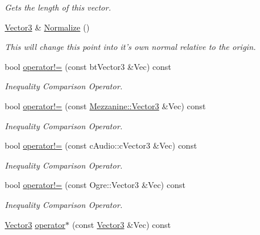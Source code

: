 \begin{DoxyCompactItemize}
\begin{DoxyCompactList}\small\item\em Gets the length of this vector. \item\end{DoxyCompactList}\item 
\hyperlink{classMezzanine_1_1Vector3}{Vector3} \& \hyperlink{classMezzanine_1_1Vector3_aa8705900b168f9d5234bf6de5e9564b1}{Normalize} ()
\begin{DoxyCompactList}\small\item\em This will change this point into it's own normal relative to the origin. \item\end{DoxyCompactList}\item 
bool \hyperlink{classMezzanine_1_1Vector3_a5553723899629247d1fd8031ede27c31}{operator!=} (const btVector3 \&Vec) const 
\begin{DoxyCompactList}\small\item\em Inequality Comparison Operator. \item\end{DoxyCompactList}\item 
bool \hyperlink{classMezzanine_1_1Vector3_ab17e377c8178ed18adf453c6f55a2471}{operator!=} (const \hyperlink{classMezzanine_1_1Vector3}{Mezzanine::Vector3} \&Vec) const 
\begin{DoxyCompactList}\small\item\em Inequality Comparison Operator. \item\end{DoxyCompactList}\item 
bool \hyperlink{classMezzanine_1_1Vector3_a8888d70d5fb5d3a1aebb458d14da9ad1}{operator!=} (const cAudio::cVector3 \&Vec) const 
\begin{DoxyCompactList}\small\item\em Inequality Comparison Operator. \item\end{DoxyCompactList}\item 
bool \hyperlink{classMezzanine_1_1Vector3_a719f34907dcd4872bde9558b9c61dc8b}{operator!=} (const Ogre::Vector3 \&Vec) const 
\begin{DoxyCompactList}\small\item\em Inequality Comparison Operator. \item\end{DoxyCompactList}\item 
\hyperlink{classMezzanine_1_1Vector3}{Vector3} \hyperlink{classMezzanine_1_1Vector3_a5d950bff38f35d01f31178b9a281bfca}{operator$\ast$} (const \hyperlink{classMezzanine_1_1Vector3}{Vector3} \&Vec) const 

\end{DoxyCompactItemize}

